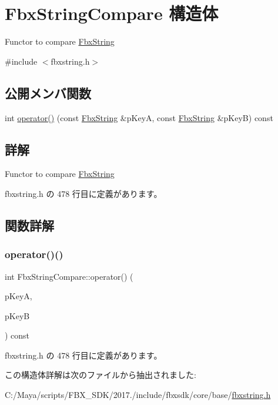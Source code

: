 \hypertarget{struct_fbx_string_compare}{}\section{Fbx\+String\+Compare 構造体}
\label{struct_fbx_string_compare}


Functor to compare \hyperlink{class_fbx_string}{Fbx\+String}  




{\ttfamily \#include $<$fbxstring.\+h$>$}

\subsection*{公開メンバ関数}
\begin{DoxyCompactItemize}
\item 
int \hyperlink{struct_fbx_string_compare_a3dd785a940f883203d4ad15c9204e47f}{operator()} (const \hyperlink{class_fbx_string}{Fbx\+String} \&p\+KeyA, const \hyperlink{class_fbx_string}{Fbx\+String} \&p\+KeyB) const
\end{DoxyCompactItemize}


\subsection{詳解}
Functor to compare \hyperlink{class_fbx_string}{Fbx\+String} 

 fbxstring.\+h の 478 行目に定義があります。



\subsection{関数詳解}
\mbox{\label{struct_fbx_string_compare_a3dd785a940f883203d4ad15c9204e47f}} 
\subsubsection{\texorpdfstring{operator()()}{operator()()}}
{\footnotesize\ttfamily int Fbx\+String\+Compare\+::operator() (\begin{DoxyParamCaption}\item[{const \hyperlink{class_fbx_string}{Fbx\+String} \&}]{p\+KeyA,  }\item[{const \hyperlink{class_fbx_string}{Fbx\+String} \&}]{p\+KeyB }\end{DoxyParamCaption}) const\hspace{0.3cm}{\ttfamily [inline]}}



 fbxstring.\+h の 478 行目に定義があります。



この構造体詳解は次のファイルから抽出されました\+:\begin{DoxyCompactItemize}
\item 
C\+:/\+Maya/scripts/\+F\+B\+X\+\_\+\+S\+D\+K/2017./include/fbxsdk/core/base/\hyperlink{fbxstring_8h}{fbxstring.\+h}\end{DoxyCompactItemize}

